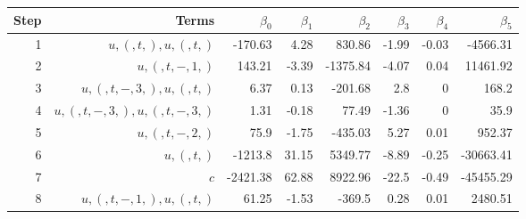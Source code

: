 \begin{tabular}{rrrrrrrr}
Step & Terms & $\beta_{0}$ & $\beta_{1}$ & $\beta_{2}$ & $\beta_{3}$ & $\beta_{4}$ & $\beta_{5}$ \\ 
\hline 
1 & $u,(,t,),u,(,t,)$ & -170.63 & 4.28 & 830.86 & -1.99 & -0.03 & -4566.31 \\ 
2 & $u,(,t,-,1,)$ & 143.21 & -3.39 & -1375.84 & -4.07 & 0.04 & 11461.92 \\ 
3 & $u,(,t,-,3,),u,(,t,)$ & 6.37 & 0.13 & -201.68 & 2.8 & 0 & 168.2 \\ 
4 & $u,(,t,-,3,),u,(,t,-,3,)$ & 1.31 & -0.18 & 77.49 & -1.36 & 0 & 35.9 \\ 
5 & $u,(,t,-,2,)$ & 75.9 & -1.75 & -435.03 & 5.27 & 0.01 & 952.37 \\ 
6 & $u,(,t,)$ & -1213.8 & 31.15 & 5349.77 & -8.89 & -0.25 & -30663.41 \\ 
7 & $c$ & -2421.38 & 62.88 & 8922.96 & -22.5 & -0.49 & -45455.29 \\ 
8 & $u,(,t,-,1,),u,(,t,)$ & 61.25 & -1.53 & -369.5 & 0.28 & 0.01 & 2480.51 \\ 
\hline 
\end{tabular}